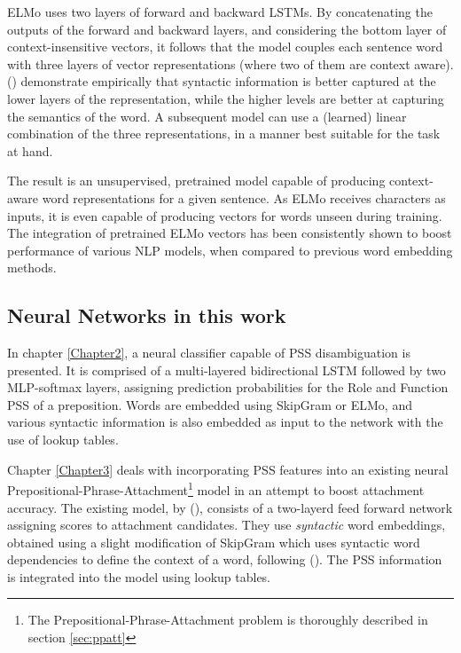 ELMo uses two layers of forward and backward LSTMs. By concatenating the outputs of the forward and backward layers, and considering the bottom layer of context-insensitive vectors, it follows that the model couples each sentence word with three layers of vector representations (where two of them are context aware). (\cite{elmo}) demonstrate empirically that syntactic information is better captured at the lower layers of the representation, while the higher levels are better at capturing the semantics of the word.  A subsequent model can use a (learned) linear combination of the three representations, in a manner best suitable for the task at hand. 

The result is an unsupervised, pretrained model capable of producing context-aware word representations for a given sentence. As ELMo receives characters as inputs, it is even capable of producing vectors for words unseen during training. The integration of pretrained ELMo vectors has been consistently shown to boost performance of various NLP models, when compared to previous word embedding methods. 

\subsection{Neural Networks in this work}

In chapter \ref{Chapter2}, a neural classifier capable of PSS disambiguation is presented. It is comprised of a multi-layered bidirectional LSTM followed by two MLP-softmax layers, assigning prediction probabilities for the Role and Function PSS of a preposition. Words are embedded using SkipGram or ELMo, and various syntactic information is also embedded as input to the network with the use of lookup tables. 

Chapter \ref{Chapter3} deals with incorporating PSS features into an existing neural Prepositional-Phrase-Attachment\footnote{The Prepositional-Phrase-Attachment problem is thoroughly described in section \ref{sec:ppatt}} model in an attempt to boost attachment accuracy. The existing model, by (\cite{hpcd}), consists of a two-layerd feed forward network assigning scores to attachment candidates. They use \emph{syntactic} word embeddings, obtained using a slight modification of SkipGram which uses syntactic word dependencies to define the context of a word, following (\cite{bansal}). The PSS information is integrated into the model using lookup tables.

\pagebreak

